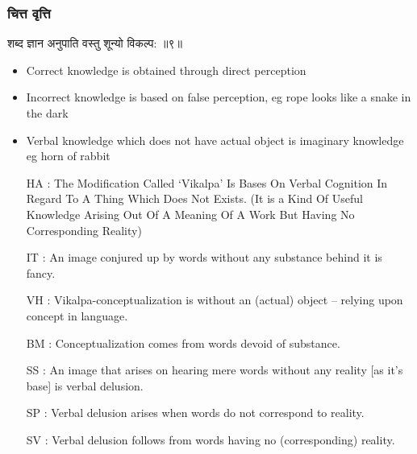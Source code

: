 \begin{frame}[fragile]\frametitle{चित्त वृत्ति}

\begin{sanskrit}
शब्द ज्ञान अनुपाति वस्तु शून्यो विकल्प: ॥९॥
\end{sanskrit}


	\begin{itemize}
	\item Correct knowledge is obtained through direct perception
	\item Incorrect knowledge is based on false perception, eg rope looks like a snake in the dark
	\item Verbal knowledge which does not have actual object is imaginary knowledge eg horn of rabbit
	\item [HA]: The Modification Called ‘Vikalpa’ Is Bases On Verbal Cognition In Regard To A Thing Which Does Not Exists. (It is a Kind Of Useful Knowledge Arising Out Of A Meaning Of A Work But Having No Corresponding Reality)
	\item [IT]: An image conjured up by words without any substance behind it is fancy.
	\item [VH]: Vikalpa-conceptualization is without an (actual) object – relying upon concept in language.
	\item [BM]: Conceptualization comes from words devoid of substance.
	\item [SS]: An image that arises on hearing mere words without any reality [as it’s base] is verbal delusion.
	\item [SP]: Verbal delusion arises when words do not correspond to reality.
	\item [SV]: Verbal delusion follows from words having no (corresponding) reality.
	\end{itemize}

\end{frame}

